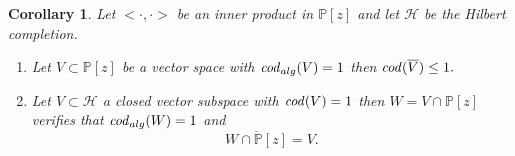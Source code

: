 \documentclass[12pt]{amsart}
\theoremstyle{definition}
\theoremstyle{plain}
\newtheorem{corollary}{Corollary}
\theoremstyle{remark}
\begin{document}
\begin{corollary} Let $<\cdot,\cdot>$ be an inner product in $\mathbb{P}[z]$ and let $\mathcal{H}$ be the Hilbert completion. 
\begin{enumerate}
    \item Let $V \subset \mathbb{P}[z]$ be a vector space with ${\it cod}_{alg}(V)=1$ then ${\it cod}(\overline{V})\leq 1.$    
    \item Let  $V\subset \mathcal{H}$ a closed vector subspace with ${\it cod}(V)=1$ then $W=V\cap \mathbb{P}[z]$ verifies that ${\it cod}_{alg}(W)=1$ and 
$$
\overline{W\cap \mathbb{P}[z]} = V.
$$
    
\end{enumerate}
\end{corollary}
\end{document}
